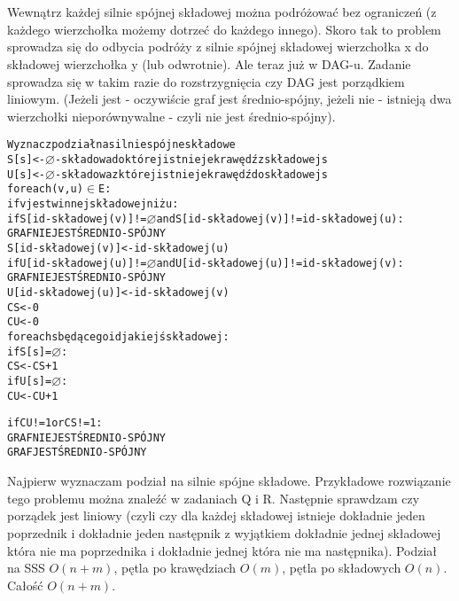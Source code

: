 \documentclass[a4paper,12pt]{article}
\begin{document}
\section{}
Wewnątrz każdej silnie spójnej składowej można podróżować bez ograniczeń (z każdego wierzchołka możemy dotrzeć do każdego innego). Skoro tak to problem sprowadza się do odbycia podróży z silnie spójnej składowej wierzchołka x do składowej wierzchołka y (lub odwrotnie). Ale teraz już w DAG-u. Zadanie sprowadza się w takim razie do rozstrzygnięcia czy DAG jest porządkiem liniowym. (Jeżeli jest - oczywiście graf jest średnio-spójny, jeżeli nie - istnieją dwa wierzchołki nieporównywalne - czyli nie jest średnio-spójny).
\begin{alltt}
 Wyznacz podział na silnie spójne składowe
 S[s] <- \(\varnothing\) - składowa do której istnieje krawędź z składowej s
 U[s] <- \(\varnothing\) - składowa z której istnieje krawędź do składowej s
 for each (v,u) \(\in\) E:
    if v jest w innej składowej niż u:
        if S[id-składowej(v)] != \(\varnothing\) and S[id-składowej(v)] != id-składowej(u):
            GRAF NIE JEST ŚREDNIO-SPÓJNY
        S[id-składowej(v)] <- id-składowej(u)
        if U[id-składowej(u)] != \(\varnothing\) and U[id-składowej(u)] != id-składowej(v):
            GRAF NIE JEST ŚREDNIO-SPÓJNY
        U[id-składowej(u)] <- id-składowej(v)
 CS <- 0
 CU <- 0
 for each s będącego id jakiejś składowej:
    if S[s] = \(\varnothing\):
        CS <- CS + 1
    if U[s] = \(\varnothing\):
        CU <- CU + 1
    
 if CU != 1 or CS != 1:
    GRAF NIE JEST ŚREDNIO-SPÓJNY
 GRAF JEST ŚREDNIO-SPÓJNY
\end{alltt}
Najpierw wyznaczam podział na silnie spójne składowe. Przykładowe rozwiązanie tego problemu można znaleźć w zadaniach Q i R. Następnie sprawdzam czy porządek jest liniowy (czyli czy dla każdej składowej istnieje dokładnie jeden poprzednik i dokładnie jeden następnik z wyjątkiem dokładnie jednej składowej która nie ma poprzednika i dokładnie jednej która nie ma następnika). Podział na SSS $O(n+m)$, pętla po krawędziach $O(m)$, pętla po składowych $O(n)$. Całość $O(n+m)$.

\section{}
\end{document}
